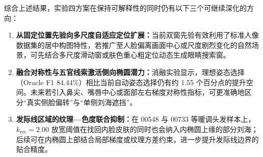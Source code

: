 综合上述结果，实验四方案在保持可解释性的同时仍有以下三个可继续深化的方向：
\begin{enumerate}
\item \textbf{从固定位置先验向多尺度自适应定位扩展：}当前双窗先验有效利用了标准人像数据集的居中构图特性，若推广至人脸偏离画面中心或尺度剧烈变化的自然场景，可先结合多尺度滑动窗或肤色重心粗定位动态生成眼睛搜索窗。
\item \textbf{融合对称性与五官线索激活侧向椭圆潜力：}消融实验显示，理想姿态选择（Oracle F1 84.44\%）相比当前自动姿态选择仍有约 1.55 个百分点的提升空间。未来若引入鼻尖、嘴唇中心或面部左右梯度对称性指标，可更准确地区分“真实侧脸偏转”与“单侧刘海遮挡”。
\item \textbf{发际线区域的纹理—色度联合抑制：}在 00548 与 00733 等暖调头发样本上，$k_{\text{rec}}=2.00$ 放宽阈值在找回内脸皮肤的同时也会纳入内椭圆上缘的部分刘海；后续可在内椭圆上部结合局部梯度或纹理方差约束，进一步提升发际线边界的贴合精度。
\end{enumerate}
